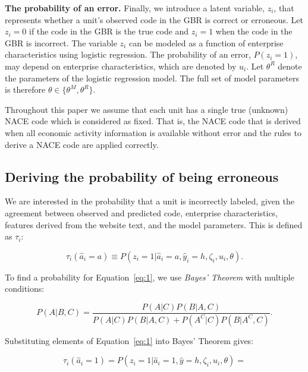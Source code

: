 \documentclass[12pt, a4paper, titlepage]{article}
\begin{document}
\textbf{The probability of an error.} Finally, we introduce a latent variable, $z_i$, that represents whether a unit's observed code in the GBR is correct or erroneous. Let $z_i = 0$ if the code in the GBR is the true code and $z_i = 1$ when the code in the GBR is incorrect. The variable $z_i$ can be modeled as a function of enterprise characteristics using logistic regression. The probability of an error, $P(z_i = 1)$, may depend on enterprise characteristics, which are denoted by $u_i$. Let $\theta^R$ denote the parameters of the logistic regression model. The full set of model parameters is therefore $\theta \in \{ \theta^M, \theta^R\}$. 

Throughout this paper we assume that each unit has a single true (unknown) NACE code which is considered as fixed. That is, the NACE code that is derived when all economic activity information is available without error and the rules to derive a NACE code are applied correctly.

					\subsection{Deriving the probability of being erroneous}
					\label{section:probs}

We are interested in the probability that a unit is incorrectly labeled, given the agreement between observed and predicted code, enterprise characteristics, features derived from the website text, and the model parameters. This is defined as $\tau_i$:

						\begin{equation} \label{eq:1}
\tau_i(\hat{a}_i = a) \equiv P(z_i = 1 | \hat{a}_i = a, \hat{y}_i = h, \zeta_i, u_i, \theta).
						\end{equation}

To find a probability for Equation~\ref{eq:1}, we use \textit{Bayes' Theorem} with multiple conditions:

						\begin{equation*} \label{eq:bayes}
P(A | B, C) =  \frac{P(A | C) P(B | A, C)}{P(A|C)P(B|A,C) + P(A^C|C)P(B|A^C, C)}   .
						\end{equation*}

Substituting elements of Equation~\ref{eq:1} into Bayes' Theorem gives: 

						\begin{equation}\label{eq:2}
\tau_i(\hat{a}_i = 1) = P(z_i = 1 | \hat{a}_i = 1, \hat{y} = h, \zeta_i, u_i, \theta) = 
						\end{equation}
\end{document}
